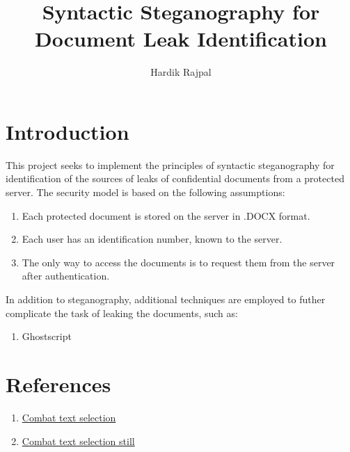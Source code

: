 \documentclass{article}
\author{Hardik Rajpal}
\title{Syntactic Steganography for Document Leak Identification}
\begin{document}
\maketitle
\section{Introduction}
This project seeks to implement the principles of syntactic steganography for identification of the sources of leaks of confidential documents from a protected server. The security model is based on the following assumptions:
\begin{enumerate}
\item Each protected document is stored on the server in .DOCX format.
\item Each user has an identification number, known to the server.
\item The only way to access the documents is to request them from the server after authentication.
\end{enumerate}
In addition to steganography, additional techniques are employed to futher complicate the task of leaking the documents, such as:
\begin{enumerate}
\item Ghostscript 
\end{enumerate}
\section{References}
\begin{enumerate}
\item \href{https://tex.stackexchange.com/questions/507288/minted-make-text-non-selectable-on-output-pdf}{Combat text selection}
\item \href{https://stackoverflow.com/questions/28797418/replace-all-font-glyphs-in-a-pdf-by-converting-them-to-outline-shapes}{Combat text selection still}
\end{enumerate}
\end{document}
